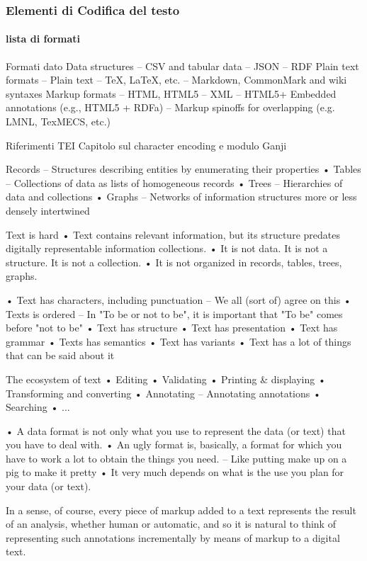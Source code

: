 \begin{frame}
    \frametitle{Elementi di Codifica del testo}
    \framesubtitle{lista di formati}
    \addtocounter{nframe}{1}
    
    \begin{block}{Formati dato}
Data structures – CSV and tabular data
– JSON
– RDF
Plain text formats – Plain text
– TeX, LaTeX, etc.
– Markdown, CommonMark and wiki syntaxes
Markup formats
– HTML, HTML5
– XML
– HTML5+ Embedded annotations (e.g., HTML5 + RDFa)
– Markup spinoffs for overlapping (e.g. LMNL, TexMECS, etc.) 

    \end{block}

    \begin{block}{Riferimenti TEI}
        Capitolo sul character encoding e modulo Ganji 
    \end{block}

\end{frame}


Records
– Structures describing entities by enumerating their
properties
• Tables
– Collections of data as lists of homogeneous
records
• Trees
– Hierarchies of data and collections
• Graphs
– Networks of information structures more or less
densely intertwined 




Text is hard
• Text contains relevant information, but its
structure predates digitally representable
information collections.
• It is not data. It is not a structure. It is not a
collection.
• It is not organized in records, tables, trees,
graphs. 

• Text has characters, including punctuation
– We all (sort of) agree on this
• Texts is ordered
– In "To be or not to be", it is important that "To be"
comes before "not to be"
• Text has structure
• Text has presentation
• Text has grammar
• Texts has semantics
• Text has variants
• Text has a lot of things that can be said about it 



The ecosystem of text
• Editing
• Validating
• Printing & displaying
• Transforming and converting
• Annotating
– Annotating annotations
• Searching
• ... 

• A data format is not only what you use to
represent the data (or text) that you have to
deal with.
• An ugly format is, basically, a format for which
you have to work a lot to obtain the things you
need.
– Like putting make up on a pig to make it pretty
• It very much depends on what is the use you
plan for your data (or text). 

In a sense, of course, every piece of markup added to a text represents the result of an analysis, whether human or automatic, and so it is natural to think of representing such annotations incrementally by means of markup to a digital text.

